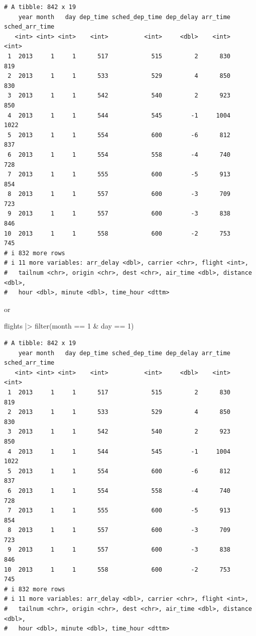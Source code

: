 \documentclass[
  letterpaper,
  DIV=11,
  numbers=noendperiod]{scrreprt}
\newenvironment{Shaded}{\begin{snugshade}}{\end{snugshade}}
\newcommand{\DecValTok}[1]{\textcolor[rgb]{0.68,0.00,0.00}{#1}}
\newcommand{\FunctionTok}[1]{\textcolor[rgb]{0.28,0.35,0.67}{#1}}
\newcommand{\NormalTok}[1]{\textcolor[rgb]{0.00,0.23,0.31}{#1}}
\newcommand{\SpecialCharTok}[1]{\textcolor[rgb]{0.37,0.37,0.37}{#1}}
\begin{document}
\begin{verbatim}
# A tibble: 842 x 19
    year month   day dep_time sched_dep_time dep_delay arr_time sched_arr_time
   <int> <int> <int>    <int>          <int>     <dbl>    <int>          <int>
 1  2013     1     1      517            515         2      830            819
 2  2013     1     1      533            529         4      850            830
 3  2013     1     1      542            540         2      923            850
 4  2013     1     1      544            545        -1     1004           1022
 5  2013     1     1      554            600        -6      812            837
 6  2013     1     1      554            558        -4      740            728
 7  2013     1     1      555            600        -5      913            854
 8  2013     1     1      557            600        -3      709            723
 9  2013     1     1      557            600        -3      838            846
10  2013     1     1      558            600        -2      753            745
# i 832 more rows
# i 11 more variables: arr_delay <dbl>, carrier <chr>, flight <int>,
#   tailnum <chr>, origin <chr>, dest <chr>, air_time <dbl>, distance <dbl>,
#   hour <dbl>, minute <dbl>, time_hour <dttm>
\end{verbatim}

or

\begin{Shaded}
\begin{Highlighting}[]
\NormalTok{flights }\SpecialCharTok{|\textgreater{}}
  \FunctionTok{filter}\NormalTok{(month }\SpecialCharTok{==} \DecValTok{1} \SpecialCharTok{\&}\NormalTok{ day }\SpecialCharTok{==} \DecValTok{1}\NormalTok{)}
\end{Highlighting}
\end{Shaded}

\begin{verbatim}
# A tibble: 842 x 19
    year month   day dep_time sched_dep_time dep_delay arr_time sched_arr_time
   <int> <int> <int>    <int>          <int>     <dbl>    <int>          <int>
 1  2013     1     1      517            515         2      830            819
 2  2013     1     1      533            529         4      850            830
 3  2013     1     1      542            540         2      923            850
 4  2013     1     1      544            545        -1     1004           1022
 5  2013     1     1      554            600        -6      812            837
 6  2013     1     1      554            558        -4      740            728
 7  2013     1     1      555            600        -5      913            854
 8  2013     1     1      557            600        -3      709            723
 9  2013     1     1      557            600        -3      838            846
10  2013     1     1      558            600        -2      753            745
# i 832 more rows
# i 11 more variables: arr_delay <dbl>, carrier <chr>, flight <int>,
#   tailnum <chr>, origin <chr>, dest <chr>, air_time <dbl>, distance <dbl>,
#   hour <dbl>, minute <dbl>, time_hour <dttm>
\end{verbatim}
\end{document}
